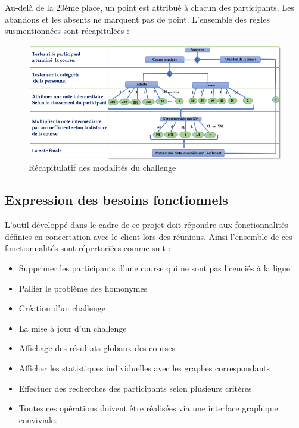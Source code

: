 	\newpage
	Au-delà de la 20ème place, un point est attribué à chacun des participants. Les abandons et les absents ne marquent pas de point. 
	L’ensemble des règles susmentionnées sont récapitulées :
	\begin{figure}[!h]
	   \center
	   \includegraphics[scale=0.9]{img/recapitulatif_modalite_challenge.png}
	   \caption {Récapitulatif des modalités du challenge}
	\end{figure}
	
	\newpage
	\subsection{Expression des besoins fonctionnels}
	L’outil développé dans le cadre de ce projet doit répondre aux fonctionnalités définies en concertation avec le client lors des réunions. Ainsi l’ensemble de ces fonctionnalités sont répertoriées comme suit :
	\begin{itemize} 
	\item Supprimer les participants d'une course qui ne sont pas licenciés à la ligue	
	\item Pallier le problème des homonymes 
	\item Création d’un challenge
	\item La mise à jour d’un challenge
	\item Affichage des résultats globaux des courses
	\item Afficher les statistiques individuelles avec les graphes correspondants
	\item Effectuer des recherches des participants selon plusieurs critères
	\item Toutes ces opérations doivent être réalisées via une interface graphique conviviale.
	\end{itemize} 
	
